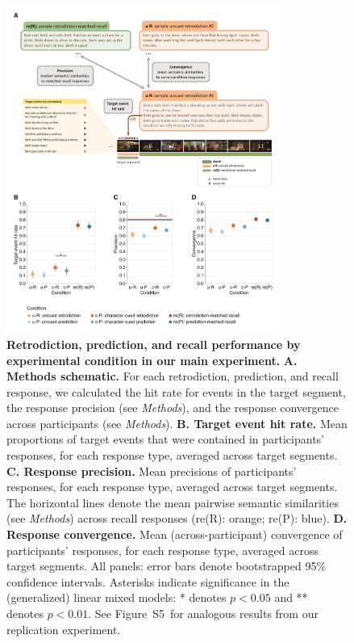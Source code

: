\documentclass[10pt]{article}
\newcommand{\targetAsymmetries}{S5}
\begin{document}
\begin{figure}[tp]
  \centering
  \includegraphics[width=0.80\textwidth]{results1}

  \caption{\textbf{Retrodiction, prediction, and recall performance by
  experimental condition in our main experiment.} \textbf{A. Methods schematic.} For each retrodiction, prediction, and recall response, we calculated the hit rate for events in the target segment, the response precision (see \textit{Methods}), and the response convergence across participants (see \textit{Methods}). \textbf{B. Target event hit rate.} Mean proportions of target events that were contained in participants' responses, for each response type, averaged across target segments. \textbf{C. Response precision.} Mean precisions of participants' responses, for each response type, averaged across target segments. The horizontal lines denote the mean pairwise semantic similarities (see \textit{Methods}) across recall responses (re(R): orange; re(P): blue). \textbf{D. Response convergence.} Mean (across-participant) convergence of participants' responses, for each response type, averaged across target segments. All panels: error bars denote bootstrapped 95\% confidence intervals. Asterisks indicate significance in the (generalized) linear mixed models: * denotes $p < 0.05$ and ** denotes $p < 0.01$. See Figure~\targetAsymmetries~for analogous results from our replication experiment.}

  \label{fig:result1}
\end{figure}
\end{document}
